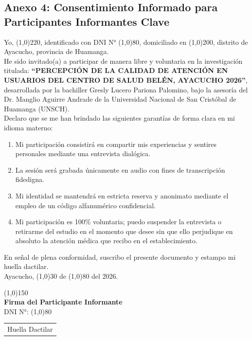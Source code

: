 \subsection*{Anexo 4: Consentimiento Informado para Participantes Informantes Clave}
\label{anx:4_consentimiento}

\noindent Yo, \line(1,0){220}, identificado con DNI N° \line(1,0){80}, domiciliado en \line(1,0){200}, distrito de Ayacucho, provincia de Huamanga.\\

\noindent He sido invitado(a) a participar de manera libre y voluntaria en la investigación titulada: \textbf{``PERCEPCIÓN DE LA CALIDAD DE ATENCIÓN EN USUARIOS DEL CENTRO DE SALUD BELÉN, AYACUCHO 2026''}, desarrollada por la bachiller Gresly Lucero Pariona Palomino, bajo la asesoría del Dr. Manglio Aguirre Andrade de la Universidad Nacional de San Cristóbal de Huamanga (UNSCH).\\

\noindent Declaro que se me han brindado las siguientes garantías de forma clara en mi idioma materno:
\begin{enumerate}
    \item Mi participación consistirá en compartir mis experiencias y sentires personales mediante una entrevista dialógica.
    \item La sesión será grabada únicamente en audio con fines de transcripción fidedigna.
    \item Mi identidad se mantendrá en estricta reserva y anonimato mediante el empleo de un código alfanumérico confidencial.
    \item Mi participación es 100\% voluntaria; puedo suspender la entrevista o retirarme del estudio en el momento que desee sin que ello perjudique en absoluto la atención médica que recibo en el establecimiento.
\end{enumerate}

\noindent En señal de plena conformidad, suscribo el presente documento y estampo mi huella dactilar.\\

\noindent Ayacucho, \line(1,0){30} de \line(1,0){80} del 2026.\\[1.2cm]
\begin{center}
\begin{minipage}{0.45\textwidth}
    \centering
    \line(1,0){150}\\
    \textbf{Firma del Participante Informante}\\
    DNI N°: \line(1,0){80}
\end{minipage}
\hfill
\begin{minipage}{0.45\textwidth}
    \centering
    \begin{tabular}{|c|}
        \hline
        \rule{0pt}{2.5cm}\parbox[b]{2.5cm}{\centering \scriptsize Huella Dactilar} \\
        \hline
    \end{tabular}
\end{minipage}
\end{center}

